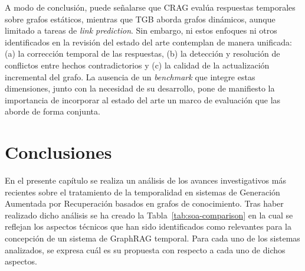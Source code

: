 A modo de conclusión, puede señalarse que CRAG evalúa respuestas temporales sobre grafos estáticos, mientras que TGB aborda grafos dinámicos, aunque limitado a tareas de \emph{link prediction}. Sin embargo, ni estos enfoques ni otros identificados en la revisión del estado del arte contemplan de manera unificada: (a) la corrección temporal de las respuestas, (b) la detección y resolución de conflictos entre hechos contradictorios y (c) la calidad de la actualización incremental del grafo. La ausencia de un \emph{benchmark} que integre estas dimensiones, junto con la necesidad de su desarrollo, pone de manifiesto la importancia de incorporar al estado del arte un marco de evaluación que las aborde de forma conjunta.

\section{Conclusiones}\label{sec:soa-conclusions}

En el presente capítulo se realiza un análisis de los avances investigativos más recientes sobre el tratamiento de la temporalidad en sistemas de Generación Aumentada por Recuperación basados en grafos de conocimiento. Tras haber realizado dicho análisis se ha creado la Tabla~\ref{tab:soa-comparison} en la cual se reflejan los aspectos técnicos que han sido identificados como relevantes para la concepción de un sistema de GraphRAG temporal. Para cada uno de los sistemas analizados, se expresa cuál es su propuesta con respecto a cada uno de dichos aspectos.

